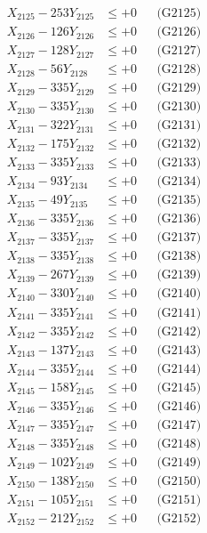 \documentclass[a4paper,10pt]{article}
\begin{document}
{\begin{align}
X_{2125} - 253Y_{2125} &\leq +0 && \text{(G2125)} \\
X_{2126} - 126Y_{2126} &\leq +0 && \text{(G2126)} \\
X_{2127} - 128Y_{2127} &\leq +0 && \text{(G2127)} \\
X_{2128} - 56Y_{2128} &\leq +0 && \text{(G2128)} \\
X_{2129} - 335Y_{2129} &\leq +0 && \text{(G2129)} \\
X_{2130} - 335Y_{2130} &\leq +0 && \text{(G2130)} \\
\allowbreak
X_{2131} - 322Y_{2131} &\leq +0 && \text{(G2131)} \\
X_{2132} - 175Y_{2132} &\leq +0 && \text{(G2132)} \\
X_{2133} - 335Y_{2133} &\leq +0 && \text{(G2133)} \\
X_{2134} - 93Y_{2134} &\leq +0 && \text{(G2134)} \\
X_{2135} - 49Y_{2135} &\leq +0 && \text{(G2135)} \\
X_{2136} - 335Y_{2136} &\leq +0 && \text{(G2136)} \\
X_{2137} - 335Y_{2137} &\leq +0 && \text{(G2137)} \\
X_{2138} - 335Y_{2138} &\leq +0 && \text{(G2138)} \\
X_{2139} - 267Y_{2139} &\leq +0 && \text{(G2139)} \\
X_{2140} - 330Y_{2140} &\leq +0 && \text{(G2140)} \\
\allowbreak
X_{2141} - 335Y_{2141} &\leq +0 && \text{(G2141)} \\
X_{2142} - 335Y_{2142} &\leq +0 && \text{(G2142)} \\
X_{2143} - 137Y_{2143} &\leq +0 && \text{(G2143)} \\
X_{2144} - 335Y_{2144} &\leq +0 && \text{(G2144)} \\
X_{2145} - 158Y_{2145} &\leq +0 && \text{(G2145)} \\
X_{2146} - 335Y_{2146} &\leq +0 && \text{(G2146)} \\
X_{2147} - 335Y_{2147} &\leq +0 && \text{(G2147)} \\
X_{2148} - 335Y_{2148} &\leq +0 && \text{(G2148)} \\
X_{2149} - 102Y_{2149} &\leq +0 && \text{(G2149)} \\
X_{2150} - 138Y_{2150} &\leq +0 && \text{(G2150)} \\
\allowbreak
X_{2151} - 105Y_{2151} &\leq +0 && \text{(G2151)} \\
X_{2152} - 212Y_{2152} &\leq +0 && \text{(G2152)} \\

\end{align}}
\end{document}

